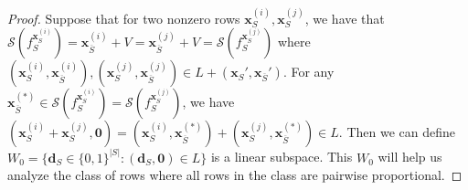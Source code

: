 \begin{proof}
    Suppose that for two nonzero rows $\mathbf{x}_S^{(i)},\mathbf{x}_S^{(j)}$, we have that $\mathscr{S}(f_{S}^{\mathbf{x}_S^{(i)}})=\mathbf{x}_{\overline{S}}^{(i)}+V=\mathbf{x}_{\overline{S}}^{(j)}+V =\mathscr{S}(f_{S}^{\mathbf{x}_S^{(j)}})$ where $(\mathbf{x}_S^{(i)},\mathbf{x}_{\overline{S}}^{(i)}),(\mathbf{x}_S^{(j)},\mathbf{x}_{\overline{S}}^{(j)})\in L+(\mathbf{x}_S',\mathbf{x}_{\overline{S}}')$. For any $\mathbf{x}_{\overline{S}}^{(*)}\in \mathscr{S}(f_{S}^{\mathbf{x}_S^{(i)}})=\mathscr{S}(f_{S}^{\mathbf{x}_S^{(j)}})$, we have $(\mathbf{x}_S^{(i)}+\mathbf{x}_S^{(j)},\mathbf{0})=(\mathbf{x}_S^{(i)},\mathbf{x}_{\overline{S}}^{(*)})+(\mathbf{x}_S^{(j)},\mathbf{x}_{\overline{S}}^{(*)})\in L$. Then we can define $W_0=\{\mathbf{d}_S\in\{0,1\}^{|S|}:(\mathbf{d}_S,\mathbf{0})\in L\}$ is a linear subspace. This $W_0$ will help us analyze the class of rows where all rows in the class are pairwise proportional.  


\end{proof}

